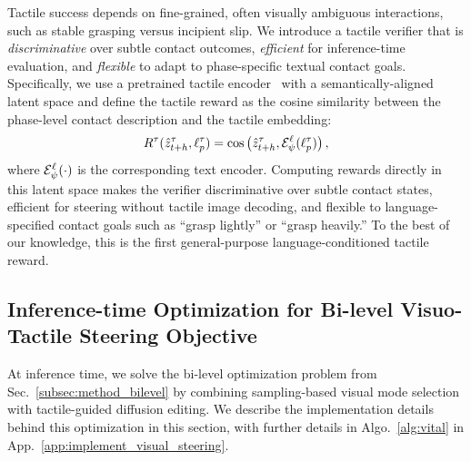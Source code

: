 Tactile success depends on fine-grained, often visually ambiguous interactions, such as stable grasping versus incipient slip. 
We introduce a tactile verifier that is \textit{discriminative} over subtle contact outcomes, \textit{efficient} for inference-time  evaluation, and \textit{flexible} to adapt to phase-specific textual contact goals.
Specifically, we use a pretrained tactile encoder~\cite{fenganytouch2} with a semantically-aligned latent space and define the tactile reward as the cosine similarity between the phase-level contact description and the tactile embedding: 
$$R^\tau(\hat{z}^\tau_{t+h}, \ell_p^\tau)
=
\cos\left(
    \hat{z}^\tau_{t+h},
    \mathcal{E}_\psi^\ell(\ell_p^\tau)
\right),$$
where $\mathcal{E}_\psi^\ell(\cdot)$ is the corresponding text encoder. Computing rewards directly in this latent space makes the verifier discriminative over subtle contact states, efficient for steering without tactile image decoding, and flexible to language-specified contact goals such as ``grasp lightly'' or ``grasp heavily.'' To the best of our knowledge, this is the first general-purpose language-conditioned tactile reward. 






\subsection{Inference-time Optimization for Bi-level Visuo-Tactile Steering Objective }
\label{subsec:method_bilevel_execution}
At inference time, we solve the bi-level optimization problem from Sec.~\ref{subsec:method_bilevel} by combining sampling-based visual mode selection with tactile-guided diffusion editing. We describe the implementation details behind this optimization in this section, with further details in Algo.~\ref{alg:vital} in App.~\ref{app:implement_visual_steering}.

